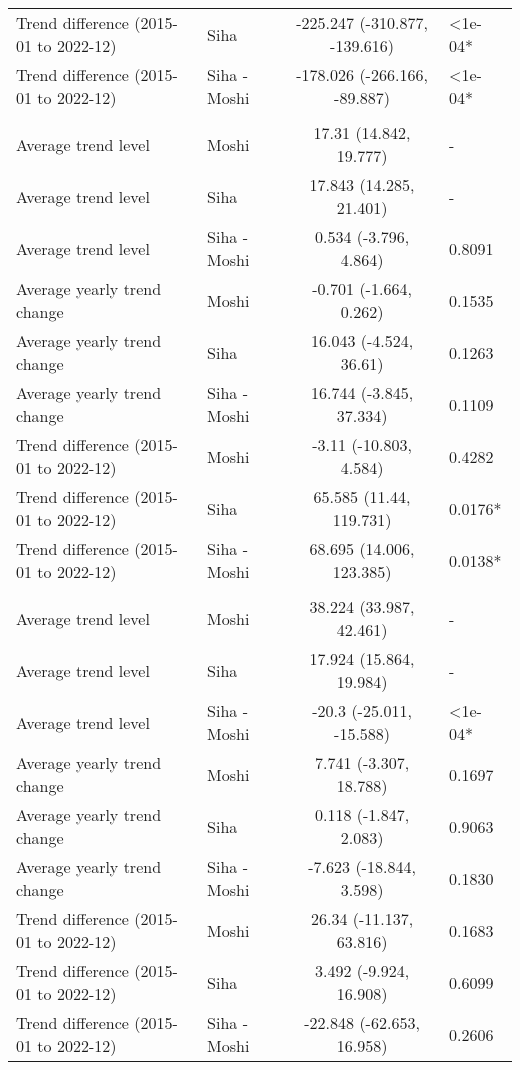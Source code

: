 \begin{longtable}{l|lcl}
Trend difference (2015-01 to 2022-12) & Siha & -225.247 (-310.877, -139.616) & <1e-04* \\ 
Trend difference (2015-01 to 2022-12) & Siha - Moshi & -178.026 (-266.166, -89.887) & <1e-04* \\ 
\midrule\addlinespace[2.5pt]
\multicolumn{4}{l}{Neoplasms/Cancer} \\[2.5pt] 
\midrule\addlinespace[2.5pt]
Average trend level & Moshi & 17.31 (14.842, 19.777) & - \\ 
Average trend level & Siha & 17.843 (14.285, 21.401) & - \\ 
Average trend level & Siha - Moshi & 0.534 (-3.796, 4.864) & 0.8091 \\ 
Average yearly trend change & Moshi & -0.701 (-1.664, 0.262) & 0.1535 \\ 
Average yearly trend change & Siha & 16.043 (-4.524, 36.61) & 0.1263 \\ 
Average yearly trend change & Siha - Moshi & 16.744 (-3.845, 37.334) & 0.1109 \\ 
Trend difference (2015-01 to 2022-12) & Moshi & -3.11 (-10.803, 4.584) & 0.4282 \\ 
Trend difference (2015-01 to 2022-12) & Siha & 65.585 (11.44, 119.731) & 0.0176* \\ 
Trend difference (2015-01 to 2022-12) & Siha - Moshi & 68.695 (14.006, 123.385) & 0.0138* \\ 
\midrule\addlinespace[2.5pt]
\multicolumn{4}{l}{Neuroses} \\[2.5pt] 
\midrule\addlinespace[2.5pt]
Average trend level & Moshi & 38.224 (33.987, 42.461) & - \\ 
Average trend level & Siha & 17.924 (15.864, 19.984) & - \\ 
Average trend level & Siha - Moshi & -20.3 (-25.011, -15.588) & <1e-04* \\ 
Average yearly trend change & Moshi & 7.741 (-3.307, 18.788) & 0.1697 \\ 
Average yearly trend change & Siha & 0.118 (-1.847, 2.083) & 0.9063 \\ 
Average yearly trend change & Siha - Moshi & -7.623 (-18.844, 3.598) & 0.1830 \\ 
Trend difference (2015-01 to 2022-12) & Moshi & 26.34 (-11.137, 63.816) & 0.1683 \\ 
Trend difference (2015-01 to 2022-12) & Siha & 3.492 (-9.924, 16.908) & 0.6099 \\ 
Trend difference (2015-01 to 2022-12) & Siha - Moshi & -22.848 (-62.653, 16.958) & 0.2606 \\ 

\end{longtable}
